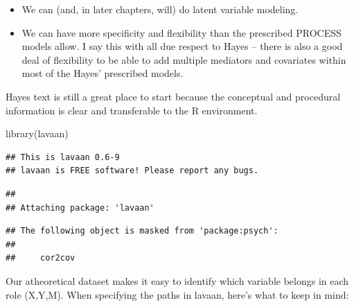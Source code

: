 \documentclass[
]{book}
\newenvironment{Shaded}{\begin{snugshade}}{\end{snugshade}}
\newcommand{\FunctionTok}[1]{\textcolor[rgb]{0.00,0.00,0.00}{#1}}
\newcommand{\NormalTok}[1]{#1}
\providecommand{\tightlist}{%
  \setlength{\itemsep}{0pt}\setlength{\parskip}{0pt}}
\begin{document}
\begin{itemize}
\tightlist
\item
  We can (and, in later chapters, will) do latent variable modeling.
\item
  We can have more specificity and flexibility than the prescribed PROCESS models allow. I say this with all due respect to Hayes -- there is also a good deal of flexibility to be able to add multiple mediators and covariates within most of the Hayes' prescribed models.
\end{itemize}

Hayes text is still a great place to start because the conceptual and procedural information is clear and transferable to the R environment.

\begin{Shaded}
\begin{Highlighting}[]
\FunctionTok{library}\NormalTok{(lavaan)}
\end{Highlighting}
\end{Shaded}

\begin{verbatim}
## This is lavaan 0.6-9
## lavaan is FREE software! Please report any bugs.
\end{verbatim}

\begin{verbatim}
## 
## Attaching package: 'lavaan'
\end{verbatim}

\begin{verbatim}
## The following object is masked from 'package:psych':
## 
##     cor2cov
\end{verbatim}

Our atheoretical dataset makes it easy to identify which variable belongs in each role (X,Y,M). When specifying the paths in lavaan, here's what to keep in mind:
\end{document}
